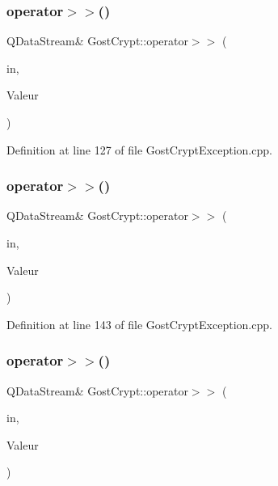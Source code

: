 \subsubsection{\texorpdfstring{operator$>$$>$()}{operator>>()}\hspace{0.1cm}{\footnotesize\ttfamily [7/13]}}
{\footnotesize\ttfamily Q\+Data\+Stream\& Gost\+Crypt\+::operator$>$$>$ (\begin{DoxyParamCaption}\item[{Q\+Data\+Stream \&}]{in,  }\item[{\hyperlink{class_gost_crypt_1_1_failed_stat_file}{Gost\+Crypt\+::\+Failed\+Stat\+File} \&}]{Valeur }\end{DoxyParamCaption})}



Definition at line 127 of file Gost\+Crypt\+Exception.\+cpp.

\mbox{\label{namespace_gost_crypt_a4567bb753648732718d0ae4a6a87b305}} 
\subsubsection{\texorpdfstring{operator$>$$>$()}{operator>>()}\hspace{0.1cm}{\footnotesize\ttfamily [8/13]}}
{\footnotesize\ttfamily Q\+Data\+Stream\& Gost\+Crypt\+::operator$>$$>$ (\begin{DoxyParamCaption}\item[{Q\+Data\+Stream \&}]{in,  }\item[{\hyperlink{class_gost_crypt_1_1_failed_read_file}{Gost\+Crypt\+::\+Failed\+Read\+File} \&}]{Valeur }\end{DoxyParamCaption})}



Definition at line 143 of file Gost\+Crypt\+Exception.\+cpp.

\mbox{\label{namespace_gost_crypt_a7eb09b5ed6b7bd62952382a0717a4dd0}} 
\subsubsection{\texorpdfstring{operator$>$$>$()}{operator>>()}\hspace{0.1cm}{\footnotesize\ttfamily [9/13]}}
{\footnotesize\ttfamily Q\+Data\+Stream\& Gost\+Crypt\+::operator$>$$>$ (\begin{DoxyParamCaption}\item[{Q\+Data\+Stream \&}]{in,  }\item[{\hyperlink{class_gost_crypt_1_1_failed_create_directory}{Gost\+Crypt\+::\+Failed\+Create\+Directory} \&}]{Valeur }\end{DoxyParamCaption})}



